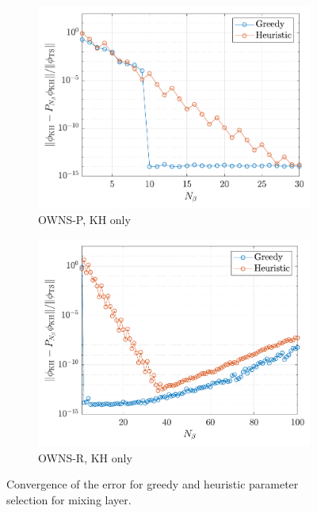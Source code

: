 \begin{figure}
\begin{subfigure}[b]{0.48\textwidth}
        \centering
        \includegraphics[width=1\linewidth]{figures/Mixing_Err_KH_P.pdf}
        \caption{OWNS-P, KH only}
        \label{fig:mixing-err-kh-p}
    \end{subfigure}
    \begin{subfigure}[b]{0.48\textwidth}
        \centering
        \includegraphics[width=1\linewidth]{figures/Mixing_Err_KH_R.pdf}
        \caption{OWNS-R, KH only}
        \label{fig:mixing-err-kh-r}
    \end{subfigure}
    \caption{Convergence of the error for greedy and heuristic parameter selection for mixing layer.}
    \label{fig:mixing-err}
\end{figure}

